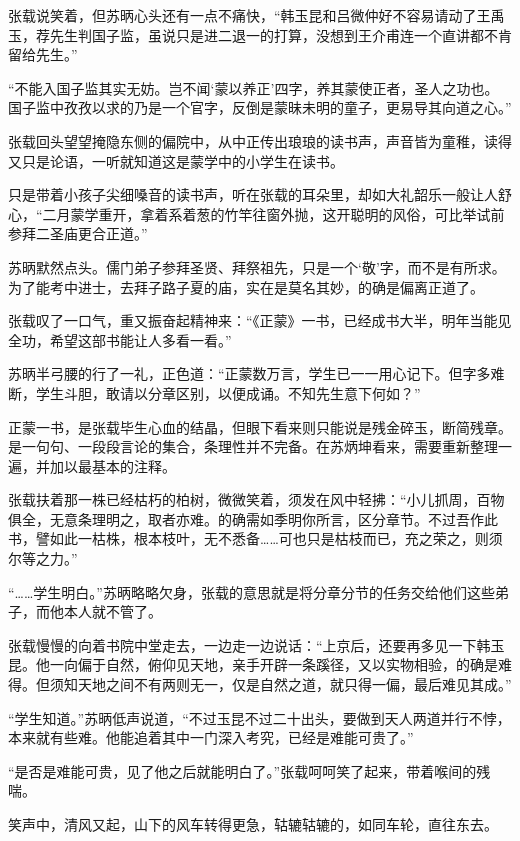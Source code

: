 张载说笑着，但苏昞心头还有一点不痛快，“韩玉昆和吕微仲好不容易请动了王禹玉，荐先生判国子监，虽说只是进二退一的打算，没想到王介甫连一个直讲都不肯留给先生。”

“不能入国子监其实无妨。岂不闻‘蒙以养正’四字，养其蒙使正者，圣人之功也。国子监中孜孜以求的乃是一个官字，反倒是蒙昧未明的童子，更易导其向道之心。”

张载回头望望掩隐东侧的偏院中，从中正传出琅琅的读书声，声音皆为童稚，读得又只是论语，一听就知道这是蒙学中的小学生在读书。

只是带着小孩子尖细嗓音的读书声，听在张载的耳朵里，却如大礼韶乐一般让人舒心，“二月蒙学重开，拿着系着葱的竹竿往窗外抛，这开聪明的风俗，可比举试前参拜二圣庙更合正道。”

苏昞默然点头。儒门弟子参拜圣贤、拜祭祖先，只是一个‘敬’字，而不是有所求。为了能考中进士，去拜子路子夏的庙，实在是莫名其妙，的确是偏离正道了。

张载叹了一口气，重又振奋起精神来：“《正蒙》一书，已经成书大半，明年当能见全功，希望这部书能让人多看一看。”

苏昞半弓腰的行了一礼，正色道：“正蒙数万言，学生已一一用心记下。但字多难断，学生斗胆，敢请以分章区别，以便成诵。不知先生意下何如？”

正蒙一书，是张载毕生心血的结晶，但眼下看来则只能说是残金碎玉，断简残章。是一句句、一段段言论的集合，条理性并不完备。在苏炳坤看来，需要重新整理一遍，并加以最基本的注释。

张载扶着那一株已经枯朽的柏树，微微笑着，须发在风中轻拂：“小儿抓周，百物俱全，无意条理明之，取者亦难。的确需如季明你所言，区分章节。不过吾作此书，譬如此一枯株，根本枝叶，无不悉备……可也只是枯枝而已，充之荣之，则须尔等之力。”

“……学生明白。”苏昞略略欠身，张载的意思就是将分章分节的任务交给他们这些弟子，而他本人就不管了。

张载慢慢的向着书院中堂走去，一边走一边说话：“上京后，还要再多见一下韩玉昆。他一向偏于自然，俯仰见天地，亲手开辟一条蹊径，又以实物相验，的确是难得。但须知天地之间不有两则无一，仅是自然之道，就只得一偏，最后难见其成。”

“学生知道。”苏昞低声说道，“不过玉昆不过二十出头，要做到天人两道并行不悖，本来就有些难。他能追着其中一门深入考究，已经是难能可贵了。”

“是否是难能可贵，见了他之后就能明白了。”张载呵呵笑了起来，带着喉间的残喘。

笑声中，清风又起，山下的风车转得更急，轱辘轱辘的，如同车轮，直往东去。

